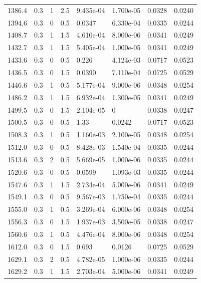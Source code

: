 \documentclass[preview]{standalone}
\begin{document}
{{{\begin{tabular}{L{1.2cm}C{1.2cm} C{0.3cm}C{0.5cm} C{1.4cm}C{1.4cm} C{1.4cm}C{1.4cm}}
  1386.4  &   0.3  & 1     & 2.5 &  9.435e-04  & 1.700e-05  & 0.0328 &  0.0240   \\ 
  1394.6  &   0.3  & 0     & 0.5 &  0.0347  & 6.330e-04  & 0.0335 &  0.0244   \\ 
  1408.7  &   0.3  & 1     & 1.5 &  4.610e-04  & 8.000e-06  & 0.0341 &  0.0249   \\ 
  1432.7  &   0.3  & 1     & 1.5 &  5.405e-04  & 1.000e-05  & 0.0341 &  0.0249   \\ 
  1433.6  &   0.3  & 0     & 0.5 &  0.226  & 4.124e-03  & 0.0717 &  0.0523   \\ 
  1436.5  &   0.3  & 0     & 1.5 &  0.0390  & 7.110e-04  & 0.0725 &  0.0529   \\ 
  1446.6  &   0.3  & 1     & 0.5 &  5.177e-04  & 9.000e-06  & 0.0348 &  0.0254   \\ 
  1486.2  &   0.3  & 1     & 1.5 &  6.932e-04  & 1.300e-05  & 0.0341 &  0.0249   \\ 
  1499.5  &   0.3  & 0     & 1.5 &  2.104e-05  & 0  & 0.0338 &  0.0247   \\ 
  1500.5  &   0.3  & 0     & 0.5 &  1.33  & 0.0242  & 0.0717 &  0.0523   \\ 
  1508.3  &   0.3  & 1     & 0.5 &  1.160e-03  & 2.100e-05  & 0.0348 &  0.0254   \\ 
  1512.0  &   0.3  & 0     & 0.5 &  8.428e-03  & 1.540e-04  & 0.0335 &  0.0244   \\ 
  1513.6  &   0.3  & 2     & 0.5 &  5.669e-05  & 1.000e-06  & 0.0335 &  0.0244   \\ 
  1520.6  &   0.3  & 0     & 0.5 &  0.0599  & 1.093e-03  & 0.0335 &  0.0244   \\ 
  1547.6  &   0.3  & 1     & 1.5 &  2.734e-04  & 5.000e-06  & 0.0341 &  0.0249   \\ 
  1549.1  &   0.3  & 0     & 0.5 &  9.567e-03  & 1.750e-04  & 0.0335 &  0.0244   \\ 
  1555.0  &   0.3  & 1     & 0.5 &  3.269e-04  & 6.000e-06  & 0.0348 &  0.0254   \\ 
  1556.3  &   0.3  & 0     & 1.5 &  1.937e-03  & 3.500e-05  & 0.0338 &  0.0247   \\ 
  1560.6  &   0.3  & 1     & 0.5 &  4.476e-04  & 8.000e-06  & 0.0348 &  0.0254   \\ 
  1612.0  &   0.3  & 0     & 1.5 &  0.693  & 0.0126  & 0.0725 &  0.0529   \\ 
  1629.1  &   0.3  & 2     & 0.5 &  4.782e-05  & 1.000e-06  & 0.0335 &  0.0244   \\ 
  1629.2  &   0.3  & 1     & 1.5 &  2.703e-04  & 5.000e-06  & 0.0341 &  0.0249   \\ 

\end{tabular}}}}
\end{document}
